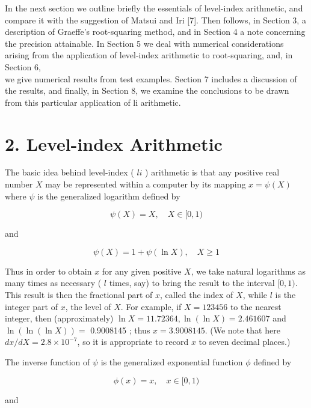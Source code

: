 \documentclass[10pt]{article}
\begin{document}
In the next section we outline briefly the essentials of level-index arithmetic, and compare it with the suggestion of Matsui and Iri [7]. Then follows, in Section 3, a description of Graeffe's root-squaring method, and in Section 4 a note concerning the precision attainable. In Section 5 we deal with numerical considerations arising from the application of level-index arithmetic to root-squaring, and, in Section 6,\\
we give numerical results from test examples. Section 7 includes a discussion of the results, and finally, in Section 8, we examine the conclusions to be drawn from this particular application of li arithmetic.

\section*{2. Level-index Arithmetic}
The basic idea behind level-index ( $l i$ ) arithmetic is that any positive real number $X$ may be represented within a computer by its mapping $x=\psi(X)$ where $\psi$ is the generalized logarithm defined by


\begin{equation*}
\psi(X)=X, \quad X \in[0,1) \tag{2.1}
\end{equation*}


and


\begin{equation*}
\psi(X)=1+\psi(\ln X), \quad X \geq 1 \tag{2.2}
\end{equation*}


Thus in order to obtain $x$ for any given positive $X$, we take natural logarithms as many times as necessary ( $l$ times, say) to bring the result to the interval $[0,1)$. This result is then the fractional part of $x$, called the index of $X$, while $l$ is the integer part of $x$, the level of $X$. For example, if $X=123456$ to the nearest integer, then (approximately) $\ln X=11.72364, \ln (\ln X)=2.461607$ and $\ln (\ln (\ln X))=$ 0.9008145 ; thus $x=3.9008145$. (We note that here $d x / d X=2.8 \times 10^{-7}$, so it is appropriate to record $x$ to seven decimal places.)

The inverse function of $\psi$ is the generalized exponential function $\phi$ defined by


\begin{equation*}
\phi(x)=x, \quad x \in[0,1) \tag{2.3}
\end{equation*}


and
\end{document}
